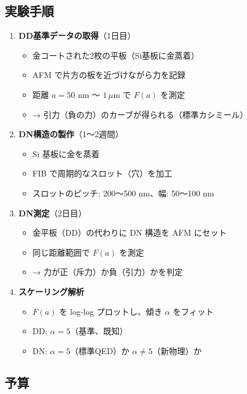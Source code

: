 \documentclass[12pt,a4paper]{article}
\begin{document}
\subsection{実験手順}
\begin{expbox}[ステップバイステップ]
\begin{enumerate}
\item \textbf{DD基準データの取得}（1日目）
  \begin{itemize}
  \item 金コートされた2枚の平板（Si基板に金蒸着）
  \item AFM で片方の板を近づけながら力を記録
  \item 距離 $a = 50$ nm 〜 $1\,\mu$m で $F(a)$ を測定
  \item → 引力（負の力）のカーブが得られる（標準カシミール）
  \end{itemize}

\item \textbf{DN構造の製作}（1〜2週間）
  \begin{itemize}
  \item Si 基板に金を蒸着
  \item FIB で周期的なスロット（穴）を加工
  \item スロットのピッチ: 200〜500 nm、幅: 50〜100 nm
  \end{itemize}

\item \textbf{DN測定}（2日目）
  \begin{itemize}
  \item 金平板（DD）の代わりに DN 構造を AFM にセット
  \item 同じ距離範囲で $F(a)$ を測定
  \item → 力が正（斥力）か負（引力）かを判定
  \end{itemize}

\item \textbf{スケーリング解析}
  \begin{itemize}
  \item $F(a)$ を log-log プロットし、傾き $\alpha$ をフィット
  \item DD: $\alpha = 5$（基準、既知）
  \item DN: $\alpha = 5$（標準QED）か $\alpha \neq 5$（新物理）か
  \end{itemize}
\end{enumerate}
\end{expbox}

\subsection{予算}
\end{document}
